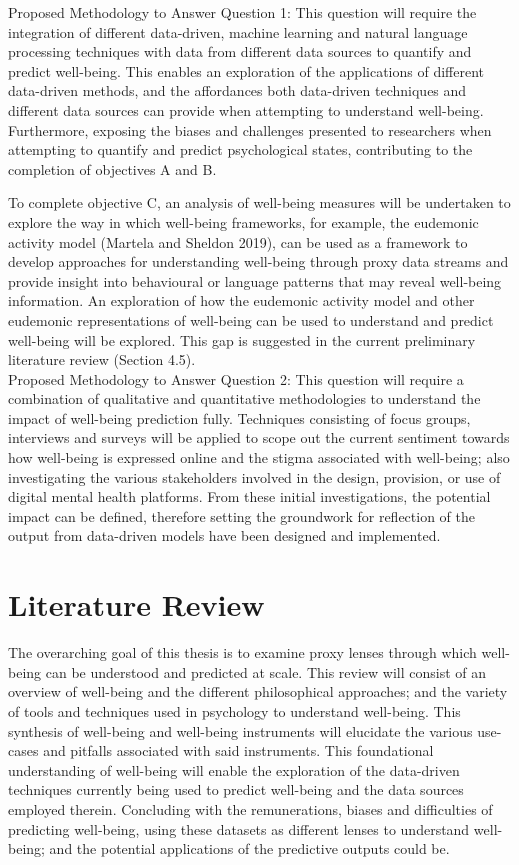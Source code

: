 \documentclass[12pt]{article}
\begin{document}
Proposed Methodology to Answer Question 1:
This question will require the integration of different data-driven, machine learning and natural language processing techniques with data from different data sources to quantify and predict well-being. This enables an exploration of the applications of different data-driven methods, and the affordances both data-driven techniques and different data sources can provide when attempting to understand well-being. Furthermore, exposing the biases and challenges presented to researchers when attempting to quantify and predict psychological states, contributing to the completion of objectives A and B.

To complete objective C, an analysis of well-being measures will be undertaken to explore the way in which well-being frameworks, for example, the eudemonic activity model (Martela and Sheldon 2019), can be used as a framework to develop approaches for understanding well-being through proxy data streams and provide insight into behavioural or language patterns that may reveal well-being information. An exploration of how the eudemonic activity model and other eudemonic representations of well-being can be used to understand and predict well-being will be explored. This gap is suggested in the current preliminary literature review (Section 4.5).\\

Proposed Methodology to Answer Question 2:
This question will require a combination of qualitative and quantitative methodologies to understand the impact of well-being prediction fully. Techniques consisting of focus groups, interviews and surveys will be applied to scope out the current sentiment towards how well-being is expressed online and the stigma associated with well-being; also investigating the various stakeholders involved in the design, provision, or use of digital mental health platforms. From these initial investigations, the potential impact can be defined, therefore setting the groundwork for reflection of the output from data-driven models have been designed and implemented.


\section{Literature Review}
The overarching goal of this thesis is to examine proxy lenses through which well-being can be understood and predicted at scale. This review will consist of an overview of well-being and the different philosophical approaches; and the variety of tools and techniques used in psychology to understand well-being. This synthesis of well-being and well-being instruments will elucidate the various use-cases and pitfalls associated with said instruments. This foundational understanding of well-being will enable the exploration of the data-driven techniques currently being used to predict well-being and the data sources employed therein. Concluding with the remunerations, biases and difficulties of predicting well-being, using these datasets as different lenses to understand well-being; and the potential applications of the predictive outputs could be. 
\end{document}
